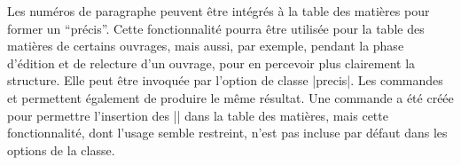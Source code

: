 \begin{noprint}
\end{noprint}

Les numéros de paragraphe peuvent être intégrés à la table des matières pour former un \enquote{précis}. Cette fonctionnalité pourra être utilisée pour la table des matières de certains ouvrages, mais aussi, par exemple, pendant la phase d'édition et de relecture d'un ouvrage, pour en percevoir plus clairement la structure. Elle peut être invoquée par l'option de classe |precis|. Les commandes  et  permettent également de produire le même résultat. Une commande  a été créée pour permettre l'insertion des |\subpara| dans la table des matières, mais cette fonctionnalité, dont l'usage semble restreint, n'est pas incluse par défaut dans les options de la classe.


\begin{noprint}
\newcommand{\precis}{\@precistrue}
\newcommand{\subprecis}{\@subprecistrue}
\newcommand{\noprecis}{\@precisfalse\@subprecisfalse}
\end{noprint}

